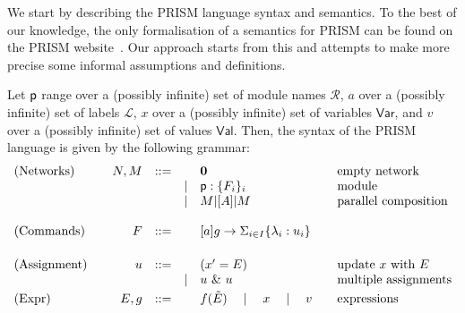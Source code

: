 We start by describing the PRISM language syntax and semantics. To the
best of our knowledge, the only formalisation of a semantics for PRISM
can be found on the PRISM website~\cite{prismemantics}. Our approach
starts from this and attempts to make more precise some informal
assumptions and definitions.

\smallskip

 Let $\textsf{p}$ range over a (possibly infinite) set of
module names $\mathcal R$, $a$ over a (possibly infinite) set of
labels $\mathcal L$, $x$ over a (possibly infinite) set of variables
$\mathsf{Var}$, and $v$ over a (possibly infinite) set of values
$\mathsf{Val}$. Then, the syntax of the PRISM language is given by the
following grammar:
\begin{displaymath}
  \begin{array}{lrlll@{\qquad}l}
    \text{(Networks)}  \quad
    & N, M  & ::=  &      & \CEnd & \text{empty network}\\
    &       &      & \mid & \role{p}:\{F_i\}_i & \text{module}\\
    &       &      & \mid & M \ppp A M & \text{parallel composition}\\
    \\
    \text{(Commands)}  \quad
    & F     & ::=  &      & \command ag\lambda u
                                  & \text{} \\
    \\[1mm]
    \text{(Assignment)} \quad
    & u     & ::=  &      & (x' = E) & \text{update $x$ %
                                       with $E$}\\
    &       &      & \mid & u\ \&\ u   & \text{multiple assignments}
    \\[1mm]
    \text{(Expr)}\quad
    & E, g     & ::= &       & f(\tilde E)\quad\mid\quad x\quad\mid\quad v & \text{expressions}
  \end{array}
\end{displaymath}
